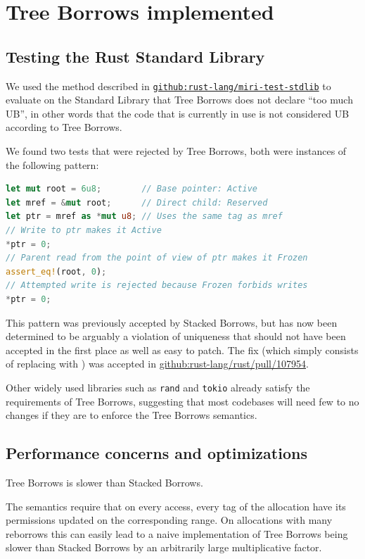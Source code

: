\documentclass[a4paper,11pt]{article}
\theoremstyle{plain}
\theoremstyle{definition}
\theoremstyle{remark}
\newcommand{\tcode}[1]{\rstinline{#1}}
\begin{document}
\section{Tree Borrows implemented}

\subsection{Testing the Rust Standard Library}

We used the method described in
\href{https://github.com/rust-lang/miri-test-stdlib}{\texttt{github:rust-lang/miri-test-stdlib}}
to evaluate on the Standard Library that Tree Borrows does not declare ``too much UB'',
in other words that the code that is currently in use is not considered UB according
to Tree Borrows.

We found two tests that were rejected by Tree Borrows, both were instances of the
following pattern:
\begin{lstlisting}[language=rust]
let mut root = 6u8;        // Base pointer: Active
let mref = &mut root;      // Direct child: Reserved
let ptr = mref as *mut u8; // Uses the same tag as mref
// Write to ptr makes it Active
*ptr = 0;
// Parent read from the point of view of ptr makes it Frozen
assert_eq!(root, 0);
// Attempted write is rejected because Frozen forbids writes
*ptr = 0;
\end{lstlisting}

This pattern was previously accepted by Stacked Borrows, but has now been determined
to be arguably a violation of uniqueness that should not have been accepted in the
first place as well as easy to patch. The fix (which simply consists of
replacing \tcode{\&mut root} with \tcode{addr\_of\_mut!(root)}) was accepted
in \href{https://github.com/rust-lang/rust/pull/107954}{github:rust-lang/rust/pull/107954}.


Other widely used libraries such as \texttt{rand} and \texttt{tokio} already
satisfy the requirements of Tree Borrows, suggesting that most codebases will
need few to no changes if they are to enforce the Tree Borrows semantics.

\subsection{Performance concerns and optimizations}

Tree Borrows is slower than Stacked Borrows.

The semantics require that on every access, every tag of the allocation have its
permissions updated on the corresponding range. On allocations with many reborrows
this can easily lead to a naive implementation of Tree Borrows being slower than
Stacked Borrows by an arbitrarily large multiplicative factor.
\end{document}
